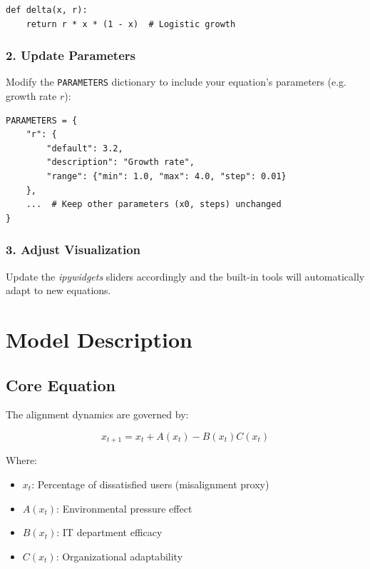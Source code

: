 \documentclass[a4paper, 10pt]{article}
\begin{document}
\begin{verbatim}
def delta(x, r):
    return r * x * (1 - x)  # Logistic growth
\end{verbatim}

\vspace{-1.5em}

\subsubsection*{2. Update Parameters}
Modify the \texttt{PARAMETERS} dictionary to include your equation's parameters (e.g. growth rate \(r\)):

\begin{verbatim}
PARAMETERS = {
    "r": {
        "default": 3.2,
        "description": "Growth rate",
        "range": {"min": 1.0, "max": 4.0, "step": 0.01}
    },
    ...  # Keep other parameters (x0, steps) unchanged
}
\end{verbatim}

\vspace{-1.5em}

\subsubsection*{3. Adjust Visualization}
Update the \textit{ipywidgets} sliders accordingly and the built-in tools will automatically adapt to new equations.

\clearpage
\section{Model Description}
\subsection{Core Equation}
The alignment dynamics are governed by:

\begin{equation}
	x_{t + 1} = x_t + A(x_t) - B(x_t)C(x_t)
\end{equation}

Where:
\begin{itemize}
	\item $x_t$: Percentage of dissatisfied users (misalignment proxy)
	\item $A(x_t)$: Environmental pressure effect
	\item $B(x_t)$: IT department efficacy
	\item $C(x_t)$: Organizational adaptability
\end{itemize}
\end{document}
